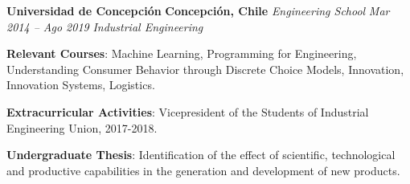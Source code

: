 \item
\headerrow
{\textbf{Universidad de Concepción}}
{\textbf{Concepción, Chile}}
\headerrow
{\emph{Engineering School}}
{\emph{Mar 2014 -- Ago 2019}}
{\emph{Industrial Engineering}}
\begin{itemize*}
    \item \textbf{Relevant Courses}: Machine Learning, Programming for Engineering, 
    Understanding Consumer Behavior through Discrete Choice Models, Innovation, 
    Innovation Systems, Logistics.
    \item \textbf{Extracurricular Activities}: Vicepresident of the Students of Industrial
    Engineering Union, 2017-2018.
    \item \textbf{Undergraduate Thesis}: Identification of the effect of scientific, 
    technological and productive capabilities in the generation and development of 
    new products.
\end{itemize*}